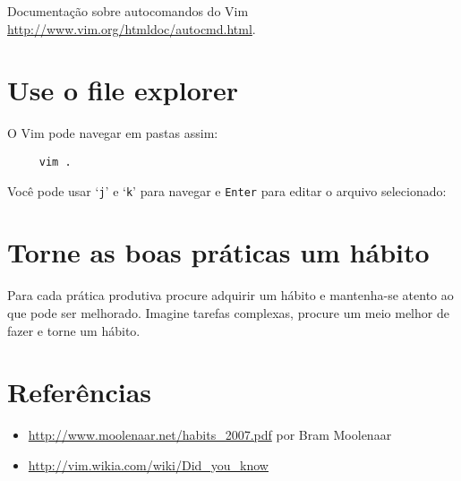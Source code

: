 Documentação sobre autocomandos do Vim \url{http://www.vim.org/htmldoc/autocmd.html}.

\section{Use o file explorer}\label{Use o file explorer}

O Vim pode navegar em pastas assim:

\begin{verbatim}
     vim .
\end{verbatim}

Você pode usar `{\tt j}' e `{\tt k}' para navegar e {\tt Enter} para editar o arquivo
selecionado:

\section{Torne as boas práticas um hábito }
\label{Torne as boas práticas um hábito }

Para cada prática produtiva procure adquirir um hábito e mantenha-se
atento ao que pode ser melhorado. Imagine tarefas complexas, procure
um meio melhor de fazer e torne um hábito.

\section{Referências}
\label{Referências}
\begin{itemize}
   \item \url{http://www.moolenaar.net/habits\_2007.pdf} por Bram Moolenaar
   \item \url{http://vim.wikia.com/wiki/Did\_you\_know}
\end{itemize}
